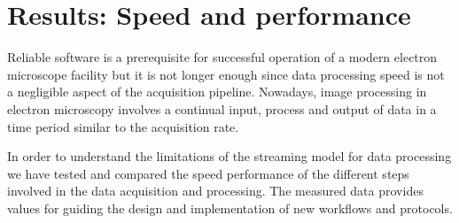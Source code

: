 \section{Results: Speed and performance}

Reliable software is a prerequisite for successful operation of a modern electron microscope facility but it is not longer enough since data processing speed is not a negligible aspect of the acquisition pipeline. Nowadays, image processing  in electron microscopy involves a continual input, process and output of data in a time period similar to the acquisition rate.

In order to understand the limitations of the streaming model for data processing we have tested and compared the speed performance of the different steps involved in the data acquisition and processing. The measured data provides values for guiding the design and implementation of new workflows and protocols.

